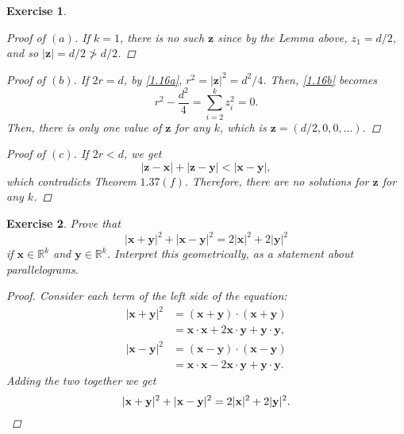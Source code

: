 \documentclass[10pt,letterpaper]{amsart}
\newtheorem{exercise}{Exercise}[section]
\theoremstyle{definition}
\theoremstyle{remark}
\numberwithin{equation}{exercise}
\begin{document}
\begin{multicols}{2}
\begin{exercise}
\begin{proof}[Proof of $(a)$]
      If $k=1$, there is no such $\mathbf{z}$ since by the Lemma above, $z_1 = d/2$, and so $|\mathbf{z}| = d/2 \not> d/2$.
    \end{proof}
    \begin{proof}[Proof of $(b)$]
      If $2r = d$, by \eqref{1.16a}, $r^2 = |\mathbf{z}|^2 = d^2/4$. Then, \eqref{1.16b} becomes
      \begin{equation*}
        r^2 - \frac{d^2}{4} = \sum_{i=2}^k z_i^2 = 0.
      \end{equation*}
      Then, there is only one value of $\mathbf{z}$ for any $k$, which is $\mathbf{z} = (d/2,0,0,\ldots)$.
    \end{proof}
    \begin{proof}[Proof of $(c)$]
      If $2r < d$, we get
      \begin{equation*}
        |\mathbf{z} - \mathbf{x}| + |\mathbf{z} - \mathbf{y}| < |\mathbf{x} - \mathbf{y}|,
      \end{equation*}
      which contradicts Theorem $1.37(f)$. Therefore, there are no solutions for $\mathbf{z}$ for any $k$.
    \end{proof}
  \end{exercise}
  \begin{exercise}\label{1.17}
    Prove that
    \begin{equation*}
      |\mathbf{x} + \mathbf{y}|^2 + |\mathbf{x} - \mathbf{y}|^2 = 2|\mathbf{x}|^2 + 2|\mathbf{y}|^2
    \end{equation*}
    if $\mathbf{x} \in \mathbb{R}^k$ and $\mathbf{y} \in \mathbb{R}^k$. Interpret this geometrically, as a statement about parallelograms.
    \begin{proof}
      Consider each term of the left side of the equation:
      \begin{align*}
        |\mathbf{x} + \mathbf{y}|^2 &= (\mathbf{x}+\mathbf{y})\cdot(\mathbf{x}+\mathbf{y})\\
        &= \mathbf{x}\cdot\mathbf{x} + 2\mathbf{x}\cdot\mathbf{y} + \mathbf{y}\cdot\mathbf{y},\\
        |\mathbf{x} - \mathbf{y}|^2 &= (\mathbf{x}-\mathbf{y})\cdot(\mathbf{x}-\mathbf{y})\\
        &= \mathbf{x}\cdot\mathbf{x} - 2\mathbf{x}\cdot\mathbf{y} + \mathbf{y}\cdot\mathbf{y}.
      \end{align*}
      Adding the two together we get
      \begin{equation*}
        |\mathbf{x} + \mathbf{y}|^2 + |\mathbf{x} - \mathbf{y}|^2 = 2|\mathbf{x}|^2 + 2|\mathbf{y}|^2.\qedhere

\end{equation*}
\end{proof}
\end{exercise}
\end{multicols}
\end{document}
